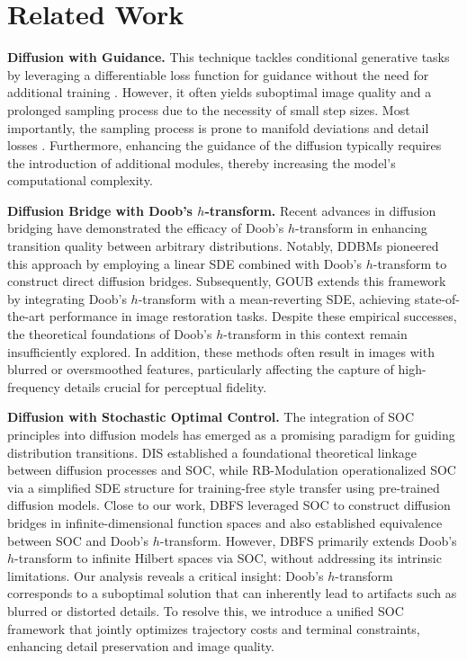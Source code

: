 \section{Related Work}
\textbf{Diffusion with Guidance.} This technique tackles conditional generative tasks by leveraging a differentiable loss function for guidance without the need for additional training \cite{chung2024diffusionposteriorsamplinggeneral, shenoy2024gradientfreeclassifierguidancediffusion, bradley2024classifierfreeguidancepredictorcorrector}. However, it often yields suboptimal image quality and a prolonged sampling process due to the necessity of small step sizes.  Most importantly, the sampling process is prone to manifold deviations and detail losses \cite{yang2024guidancesphericalgaussianconstraint}. Furthermore, enhancing the guidance of the diffusion typically requires the introduction of additional modules, thereby increasing the model’s computational complexity. 


\textbf{Diffusion Bridge with Doob's $h$-transform.} Recent advances in diffusion bridging have demonstrated the efficacy of Doob's $h$-transform in enhancing transition quality between arbitrary distributions. Notably, DDBMs \cite{zhou2023denoisingdiffusionbridgemodels} pioneered this approach by employing a linear SDE combined with Doob's $h$-transform to construct direct diffusion bridges. Subsequently, GOUB \cite{yue2024imagerestorationgeneralizedornsteinuhlenbeck} extends this framework by integrating Doob's $h$-transform with a mean-reverting SDE, achieving state-of-the-art performance in image restoration tasks. Despite these empirical successes, the theoretical foundations of Doob's $h$-transform in this context remain insufficiently explored. In addition, these methods often result in images with blurred or oversmoothed features, particularly affecting the capture of high-frequency details crucial for perceptual fidelity. 


\textbf{Diffusion with Stochastic Optimal Control.} The integration of SOC principles into diffusion models has emerged as a promising paradigm for guiding distribution transitions. DIS \cite{berner2024optimalcontrolperspectivediffusionbased} established a foundational theoretical linkage between diffusion processes and SOC, while RB-Modulation \cite{RB} operationalized SOC via a simplified SDE structure for training-free style transfer using pre-trained diffusion models. Close to our work, DBFS \cite{park2024stochasticoptimalcontroldiffusion} leveraged SOC to construct diffusion bridges in infinite-dimensional function spaces and also established equivalence between SOC and Doob's $h$-transform. However, DBFS primarily extends Doob's $h$-transform to infinite Hilbert spaces via SOC, without addressing its intrinsic limitations. Our analysis reveals a critical insight: Doob's $h$-transform corresponds to a suboptimal solution that can inherently lead to artifacts such as blurred or distorted details. To resolve this, we introduce a unified SOC framework that jointly optimizes trajectory costs and terminal constraints, enhancing detail preservation and image quality. 

